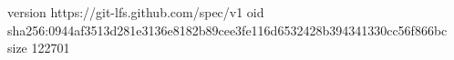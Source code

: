 version https://git-lfs.github.com/spec/v1
oid sha256:0944af3513d281e3136e8182b89cee3fe116d6532428b394341330cc56f866bc
size 122701
